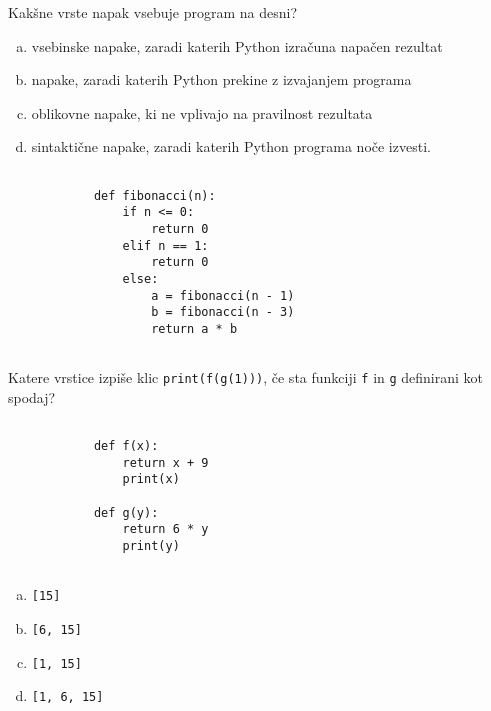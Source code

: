 \documentclass[arhiv, 10pt]{../izpit}
\newcommand{\inlinepy}[1]{\texttt{#1}}
\begin{document}
        \naloga*
        \begin{multicols}{2}
        \noindent
        Kakšne vrste napak vsebuje program na desni?

        \begin{enumerate}[(a)]
\item vsebinske napake, zaradi katerih Python izračuna napačen rezultat
\item napake, zaradi katerih Python prekine z izvajanjem programa
\item oblikovne napake, ki ne vplivajo na pravilnost rezultata
\item sintaktične napake, zaradi katerih Python programa noče izvesti.
\end{enumerate}

        \columnbreak

        \begin{verbatim}
        
            def fibonacci(n):
                if n <= 0:
                    return 0
                elif n == 1:
                    return 0
                else:
                    a = fibonacci(n - 1)
                    b = fibonacci(n - 3)
                    return a * b
            
        \end{verbatim}

        \end{multicols}

    
        \naloga*
        Katere vrstice izpiše klic \inlinepy{print(f(g(1)))}, če sta funkciji \inlinepy{f} in \inlinepy{g} definirani kot spodaj?

        \begin{multicols}{2}
        \begin{verbatim}
        
            def f(x):
                return x + 9
                print(x)

            def g(y):
                return 6 * y
                print(y)
        
        \end{verbatim}

        \begin{enumerate}[(a)]
\item \inlinepy{[15]}
\item \inlinepy{[6, 15]}
\item \inlinepy{[1, 15]}
\item \inlinepy{[1, 6, 15]}
\end{enumerate}

        \end{multicols}
    
\end{document}
